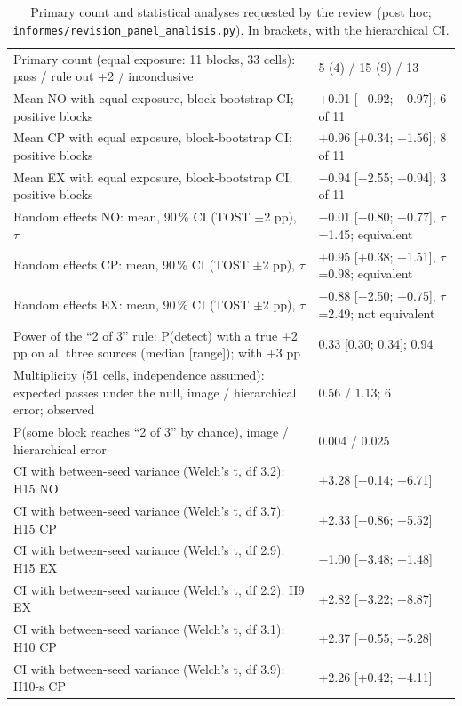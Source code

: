 \begin{table}[H]\centering\scriptsize
\caption{Primary count and statistical analyses requested by the review (post hoc; \texttt{informes/revision\_panel\_analisis.py}). In brackets, with the hierarchical CI.}\label{tab:s-panel}
\begin{tabular}{@{}p{8.6cm} p{6.6cm}@{}}\toprule
Primary count (equal exposure: 11 blocks, 33 cells): pass / rule out +2 / inconclusive & 5 (4) / 15 (9) / 13 \\
Mean NO with equal exposure, block-bootstrap CI; positive blocks & +0.01 [$-$0.92; +0.97]; 6 of 11 \\
Mean CP with equal exposure, block-bootstrap CI; positive blocks & +0.96 [+0.34; +1.56]; 8 of 11 \\
Mean EX with equal exposure, block-bootstrap CI; positive blocks & $-$0.94 [$-$2.55; +0.94]; 3 of 11 \\
Random effects NO: mean, 90\,\% CI (TOST $\pm$2 pp), $\tau$ & $-$0.01 [$-$0.80; +0.77], $\tau$=1.45; equivalent \\
Random effects CP: mean, 90\,\% CI (TOST $\pm$2 pp), $\tau$ & +0.95 [+0.38; +1.51], $\tau$=0.98; equivalent \\
Random effects EX: mean, 90\,\% CI (TOST $\pm$2 pp), $\tau$ & $-$0.88 [$-$2.50; +0.75], $\tau$=2.49; not equivalent \\
Power of the ``2 of 3'' rule: P(detect) with a true +2 pp on all three sources (median [range]); with +3 pp & 0.33 [0.30; 0.34]; 0.94 \\
Multiplicity (51 cells, independence assumed): expected passes under the null, image / hierarchical error; observed & 0.56 / 1.13; 6 \\
P(some block reaches ``2 of 3'' by chance), image / hierarchical error & 0.004 / 0.025 \\
CI with between-seed variance (Welch's t, df 3.2): H15 NO & +3.28 [$-$0.14; +6.71] \\
CI with between-seed variance (Welch's t, df 3.7): H15 CP & +2.33 [$-$0.86; +5.52] \\
CI with between-seed variance (Welch's t, df 2.9): H15 EX & $-$1.00 [$-$3.48; +1.48] \\
CI with between-seed variance (Welch's t, df 2.2): H9 EX & +2.82 [$-$3.22; +8.87] \\
CI with between-seed variance (Welch's t, df 3.1): H10 CP & +2.37 [$-$0.55; +5.28] \\
CI with between-seed variance (Welch's t, df 3.9): H10-s CP & +2.26 [+0.42; +4.11] \\

\end{tabular}
\end{table}
